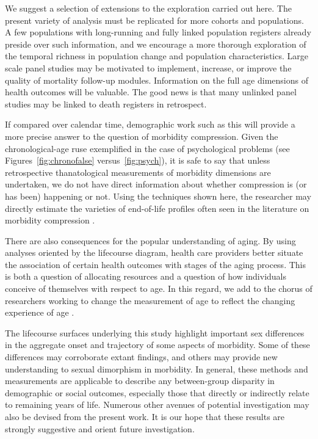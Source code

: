 \documentclass[11pt,oneside]{article} %
\begin{document}
We suggest a selection of extensions to the exploration carried out here. The
present variety of analysis must be replicated for more cohorts and populations. A few populations with long-running and fully linked population registers already preside over such information, and we encourage a
more thorough exploration of the temporal richness in population change and
population characteristics. 
Large scale panel studies may be motivated to implement, increase, or improve the quality of mortality follow-up modules. Information on the full age dimensions of health
outcomes will be valuable. The good news is that many unlinked panel studies may be linked to death registers in retrospect. 

If compared over calendar time, demographic work such as this will
provide a more precise answer to the question of morbidity compression. Given the chronological-age ruse exemplified in the case of psychological problems (see Figures~\ref{fig:chronofalse} versus~\ref{fig:psych}), it is safe to say that unless retrospective
thanatological measurements of morbidity dimensions are undertaken, we do
not have direct information about whether compression is (or has
been) happening or not. Using the techniques shown here, the researcher may
directly estimate the varieties of end-of-life profiles often seen in the
literature on morbidity compression \citep[e.g.,][]{fries2011compression}.

There are also consequences for the popular understanding of aging. By
using analyses oriented by the lifecourse diagram, health care providers better situate the association of certain health outcomes with stages of the aging process. This is both a question of allocating resources and a question of how individuals conceive of
themselves with respect to age. In this regard, we add to the chorus of
researchers working to change the measurement of age to reflect the changing
experience of age \citep[see e.g.,][]{sanderson2013characteristics}. 

The lifecourse surfaces underlying this study highlight important sex
differences in the aggregate onset and trajectory of some aspects of morbidity.
Some of these differences may corroborate extant findings, and others may
provide new understanding to sexual dimorphism in morbidity. In general, these methods and measurements are applicable to describe any between-group disparity in demographic or social outcomes, especially those
that directly or indirectly relate to remaining years of life. Numerous other
avenues of potential investigation may also be devised from the present work. It
is our hope that these results are strongly suggestive and orient future investigation.
\end{document}
